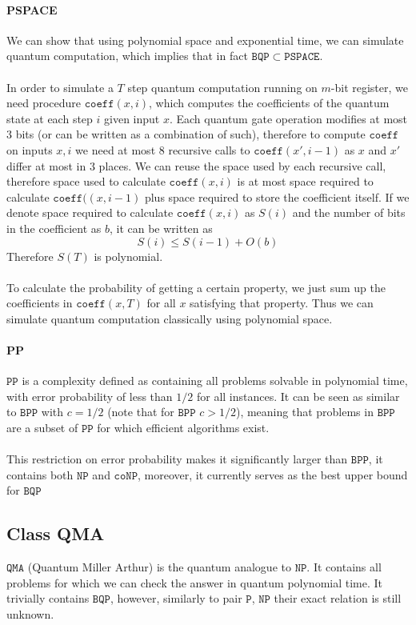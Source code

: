 \paragraph{PSPACE}
We can show that using polynomial space and exponential time, we can simulate quantum computation, which implies that in fact $\mathtt{BQP} \subset \mathtt{PSPACE}$. \\\\
In order to simulate a $T$ step quantum computation running on $m$-bit register, we need procedure $\mathtt{coeff}(x,i)$, which computes the coefficients of the quantum state at each step $i$ given input $x$. Each quantum gate operation modifies at most 3 bits (or can be written as a combination of such), therefore to compute $\mathtt{coeff}$ on inputs $x,i$ we need at most 8 recursive calls to $\mathtt{coeff}(x', i-1)$ as $x$ and $x'$ differ at most in 3 places. We can reuse the space used by each recursive call, therefore space used to calculate $\mathtt{coeff}(x,i)$ is at most space required to calculate $\mathtt{coeff}((x,i-1)$ plus space required to store the coefficient itself. If we denote space required to calculate $\mathtt{coeff}(x,i)$ as $S(i)$ and the number of bits in the coefficient as $b$, it can be written as 
$$S(i)\leq S(i-1)+O(b)$$
Therefore $S(T)$ is polynomial. \\\\
To calculate the probability of getting a certain property, we just sum up the coefficients in $\mathtt{coeff}(x,T)$ for all $x$ satisfying that property. Thus we can simulate quantum computation classically using polynomial space.
\paragraph{PP}
$\mathtt{PP}$ is a complexity defined as containing all problems solvable in polynomial time, with error probability of less than $1/2$ for all instances. It can be seen as similar to $\mathtt{BPP}$ with $c=1/2$ (note that for $\mathtt{BPP}$ $c>1/2$), meaning that problems in $\mathtt{BPP}$ are a subset of $\mathtt{PP}$ for which efficient algorithms exist.\\\\
This restriction on error probability makes it significantly larger than $\mathtt{BPP}$, it contains both $\mathtt{NP}$ and $\mathtt{coNP}$, moreover, it currently serves as the best upper bound for $\mathtt{BQP}$\cite{pp_bqp} 
\subsection{Class QMA}
$\mathtt{QMA}$ (Quantum Miller Arthur)  is the quantum analogue to $\mathtt{NP}$. It contains all problems for which we can check the answer in quantum polynomial time. It trivially contains $\mathtt{BQP}$, however, similarly to pair $\mathtt{P}$, $\mathtt{NP}$ their exact relation is still unknown.
